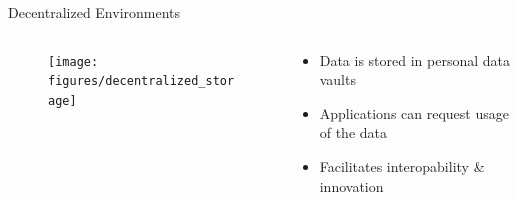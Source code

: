 \begin{frame}{Decentralized Environments}
    \begin{columns}[T] %
        \begin{column}{.48\textwidth}

       \begin{figure}
            \centering
            \texttt{[image: figures/decentralized\_storage]}
        \end{figure}

        \end{column}%
        \hfill%
        \begin{column}{.48\textwidth}
            \bigskip
            \begin{itemize}
                \item Data is stored in personal data vaults
                \item Applications can request usage of the data
                \item Facilitates interopability \& innovation
            \end{itemize}
        \end{column}%
    \end{columns}
\end{frame}
